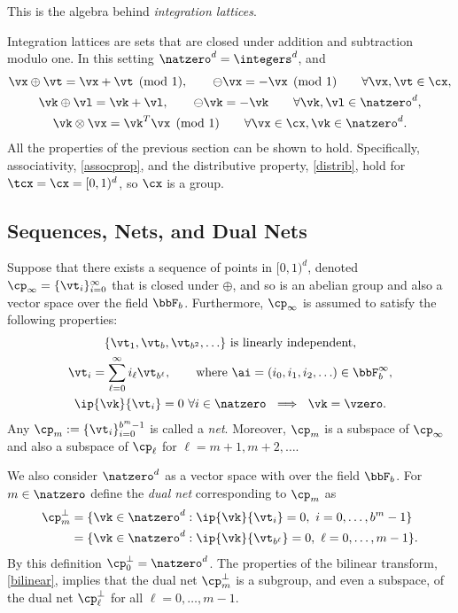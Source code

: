 \documentclass[]{elsarticle}
\theoremstyle{definition}
\newcommand{\cube}{[0,1)^d}
\renewcommand{\bbK}{\natzero^d}
\begin{document}
This is the algebra behind \emph{integration lattices}.

Integration lattices are sets that are closed under addition and subtraction modulo one.  In this setting $\bbK=\integers^d$, and
\begin{gather*}
\vx \oplus \vt = \vx + \vt \pmod 1, \qquad \ominus \vx = -\vx \pmod 1 \qquad \forall \vx, \vt \in \cx, \\
\vk \oplus \vl = \vk + \vl, \qquad \ominus \vk = -\vk \qquad \forall \vk, \vl \in \bbK, \\
\vk \otimes \vx = \vk^T \vx \pmod 1 \qquad \forall \vx \in \cx, \vk \in \bbK.
\end{gather*}
All the properties of the previous section can be shown to hold.  Specifically, associativity, \eqref{assocprop}, and the distributive property, \eqref{distrib}, hold for $\tcx = \cx=[0,1)^d$, so $\cx$ is a group.

\subsection{Sequences, Nets, and Dual Nets}
Suppose that there exists a sequence of points in $\cube$, denoted $\cp_\infty =\{\vt_i\}_{i=0}^{\infty}$ that is closed under $\oplus$, and so is an abelian group and also a vector space over the field $\bbF_b$.
Furthermore, $\cp_\infty$ is assumed to satisfy the following properties:
\begin{subequations} \label{cpinfvector}
\begin{gather}
\{\vt_1, \vt_b, \vt_{b^2}, \ldots\} \text{ is linearly independent}, \\
\vt_i = \sum_{\ell=0}^{\infty} i_\ell \vt_{b^\ell}, \qquad \text{where }\ai=(i_0, i_1, i_2, \ldots ) \in \bbF_b^\infty, \\
\ip{\vk}{\vt_i} =  0 \ \forall i \in \natzero   \ \implies \ \vk=\vzero. \label{netpropc}
\end{gather}
\end{subequations}
Any $\cp_m := \{\vt_i\}_{i=0}^{b^m-1}$ is called a \emph{net}.  Moreover, $\cp_m$ is a subspace of $\cp_\infty$ and also a subspace of $\cp_\ell$ for $\ell=m+1, m+2, \ldots$.

We also consider $\bbK$ as a vector space with over the field $\bbF_b$.  For $m \in \natzero$ define the \emph{dual net} corresponding to $\cp_m$ as
\begin{align*}
\cp^{\perp}_m &= \{\vk \in \bbK : \ip{\vk}{\vt_i} = 0, \ i=0, \ldots, b^m-1\} \\
&= \{\vk \in \bbK : \ip{\vk}{\vt_{b^{\ell}}} = 0, \ \ell=0, \ldots, m-1\}.
\end{align*}
By this definition $\cp^{\perp}_{0}=\bbK$.  The properties of the bilinear transform, \eqref{bilinear}, implies that the dual net $\cp^{\perp}_m$ is a subgroup, and even a subspace, of the dual net $\cp^{\perp}_\ell$ for all $\ell=0, \ldots, m-1$.
\end{document}
